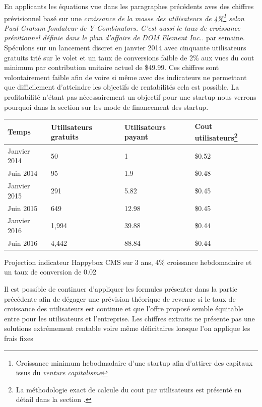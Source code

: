\documentclass[11pt, a4paper ]{article}
\begin{document}
En applicants les équations vue dans les paragraphes précédents aves des chiffres prévisionnel basé sur une \emph{croissance de la masse des utilisateurs de 4\%\footnote{Croissance minimum hebodmadaire d'une startup afin d'attirer des capitaux issus du \emph{venture capitalisme}} selon Paul Graham fondateur de Y-Combinators. C'est aussi le taux de croissance prévitionnel définie dans le plan d'affaire de DOM Element Inc..} par semaine.
Spéculons sur un lancement discret en janvier 2014 avec cinquante utilisateurs gratuits trié sur le volet et un taux de conversions faible de 2\% aux vues du cout minimum par contribution unitaire actuel de \$49.99. Ces chiffres sont volontairement faible afin de voire si même avec des indicateurs ne permettant que difficilement d'atteindre les objectifs de rentabilités cela est possible. La profitabilité n'étant pas nécessairement un objectif pour une startup nous verrons pourquoi dans la section sur les mode de financement des startup.


\begin{center}
	\begin{tabular}{|l||l|l|}
		Temps & Utilisateurs gratuits & Utilisateurs payant & Cout utilisateurs\footnote{La méthodologie exact de calcule du cout par utilisateurs est présenté en détail dans la section .}\\ %
		\hline
		Janvier 2014 & 50 & 1 & \$0.52 \\
		Juin 2014 & 95 & 1.9 & \$0.48 \\
		Janvier 2015 & 291 & 5.82 & \$0.45 \\
		Juin 2015 & 649 & 12.98 & \$0.45 \\
		Janvier 2016 & 1,994 & 39.88 & \$0.44 \\
		Juin 2016 & 4,442 & 88.84 & \$0.44 \\
	\end{tabular}
	\caption{Projection indicateur Happybox CMS sur 3 ans, 4\% croissance hebdomadaire et un taux de conversion de 0.02 }
\end{center}

Il est possible de continuer d'appliquer les formules présenter dans la partie précédente afin de dégager une prévision théorique de revenue si le taux de croissance des utilisateurs est continue et que l'offre proposé semble équitable entre pour les utilisateurs et l'entreprise. Les chiffres extraits ne présente pas une solutions extrémement rentable voire même déficitaires lorsque l'on applique les frais fixes
\end{document}

